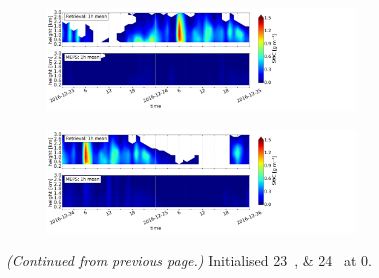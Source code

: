 \begin{figure}[t]\ContinuedFloat
	\centering
	\begin{subfigure}[t]{\textwidth}
		\centering
		\includegraphics[trim={0.cm 0.8cm 19.cm 0.5cm},clip,width=0.9\textwidth]{./fig_vert_SWC_1h/20161223}
		\caption{}\label{fig:SWC1h:23}
	\end{subfigure}
	\begin{subfigure}[t]{\textwidth}
		\centering
		\includegraphics[trim={0.cm 0.8cm 19.cm 0.5cm},clip,width=0.9\textwidth]{./fig_vert_SWC_1h/20161224}
		\caption{}\label{fig:SWC1h:24}
	\end{subfigure}
	\caption{\textit{(Continued from previous page.)} Initialised \SIlist{23;24}{\dec} at \SI{0}{\UTC}.}
\end{figure}
